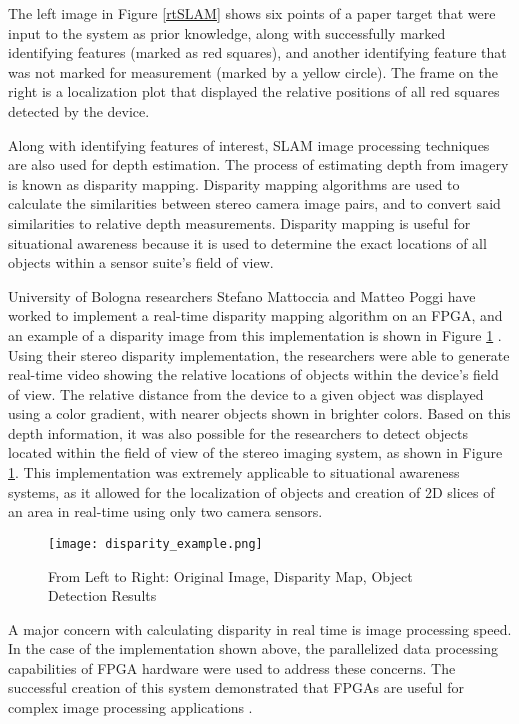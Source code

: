 The left image in Figure \ref{rtSLAM} shows six points of a paper target that were input to the system as prior knowledge, along with successfully marked identifying features (marked as red squares), and another identifying feature that was not marked for measurement (marked by a yellow circle). The frame on the right is a localization plot that displayed the relative positions of all red squares detected by the device.
\par
Along with identifying features of interest, SLAM image processing techniques are also used for depth estimation. The process of estimating depth from imagery is known as disparity mapping. Disparity mapping algorithms are used to calculate the similarities between stereo camera image pairs, and to convert said similarities to relative depth measurements. Disparity mapping is useful for situational awareness because it is used to determine the exact locations of all objects within a sensor suite's field of view.
\par
University of Bologna researchers Stefano Mattoccia and Matteo Poggi have worked to implement a real-time disparity mapping algorithm on an FPGA, and an example of a disparity image from this implementation is shown in Figure \ref{disparity_example} \cite{mattoccia}. Using their stereo disparity implementation, the researchers were able to generate real-time video showing the relative locations of objects within the device's field of view. The relative distance from the device to a given object was displayed using a color gradient, with nearer objects shown in brighter colors. Based on this depth information, it was also possible for the researchers to detect objects located within the field of view of the stereo imaging system, as shown in Figure \ref{disparity_example}. This implementation was extremely applicable to situational awareness systems, as it allowed for the localization of objects and creation of 2D slices of an area in real-time using only two camera sensors.
\par
\begin{figure}[H]
	\centerline{\texttt{[image: disparity\_example.png]}}
	\caption{From Left to Right: Original Image, Disparity Map, Object Detection Results \cite{mattoccia}}
	\label{disparity_example}
\end{figure}
\par
A major concern with calculating disparity in real time is image processing speed. In the case of the implementation shown above, the parallelized data processing capabilities of FPGA hardware were used to address these concerns. The successful creation of this system demonstrated that FPGAs are useful for complex image processing applications \cite{mattoccia}. 

